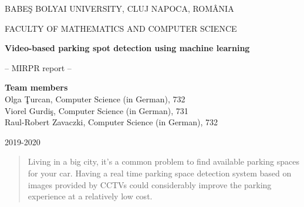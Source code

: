 \documentclass[runningheads,a4paper,11pt]{report}
\begin{document}
\begin{titlepage}
\sloppy
\begin{center}
BABE\c S BOLYAI UNIVERSITY, CLUJ NAPOCA, ROM\^ ANIA

FACULTY OF MATHEMATICS AND COMPUTER SCIENCE

\vspace{6cm}

\Huge \textbf{Video-based parking spot detection using machine learning}

\vspace{1cm}

\normalsize -- MIRPR report --

\end{center}


\vspace{5cm}

\begin{flushright}
  \Large{\textbf{Team members}}\\
  \normalsize Olga \c Turcan, Computer Science (in German), 732 \\
  \normalsize Viorel Gurdi\c s, Computer Science (in German), 731 \\
  \normalsize Raul-Robert Zavaczki, Computer Science (in German), 732
\end{flushright}

\vspace{4cm}

\begin{center}
2019-2020
\end{center}

\end{titlepage}


\begin{abstract}
	Living in a big city, it's a common problem to find available parking 
  spaces for your car. Having a real time parking space 
  detection system based on images provided by CCTVs could considerably 
  improve the parking experience at a relatively low cost.
\end{abstract}


\tableofcontents

\newpage

\listoftables
\listoffigures

\newpage




\newpage

\end{document}
